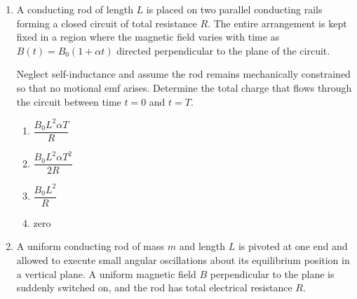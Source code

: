 \documentclass[12pt]{article}
\begin{document}
\begin{enumerate}
Assuming the motion remains planar and the string remains taut until a certain critical point, determine the minimum initial speed required such that the string just becomes slack at some point during the motion. Carefully account for varying effective gravity and radial force balance at the limiting point.
\begin{enumerate}
\item $\sqrt{5gl-\dfrac{5qEl}{m}}$
\item $\sqrt{3gl-\dfrac{3qEl}{m}}$
\item $\sqrt{2gl-\dfrac{2qEl}{m}}$
\item $\sqrt{gl-\dfrac{qEl}{m}}$
\end{enumerate}



\item
A conducting rod of length $L$ is placed on two parallel conducting rails forming a closed circuit of total resistance $R$. The entire arrangement is kept fixed in a region where the magnetic field varies with time as $B(t)=B_0(1+\alpha t)$ directed perpendicular to the plane of the circuit.

Neglect self-inductance and assume the rod remains mechanically constrained so that no motional emf arises. Determine the total charge that flows through the circuit between time $t=0$ and $t=T$.


\begin{enumerate}
\item $\dfrac{B_0L^2\alpha T}{R}$
\item $\dfrac{B_0L^2\alpha T^2}{2R}$
\item $\dfrac{B_0L^2}{R}$
\item zero
\end{enumerate}

\item
A uniform conducting rod of mass $m$ and length $L$ is pivoted at one end and allowed to execute small angular oscillations about its equilibrium position in a vertical plane. A uniform magnetic field $B$ perpendicular to the plane is suddenly switched on, and the rod has total electrical resistance $R$.


\end{enumerate}
\end{document}
